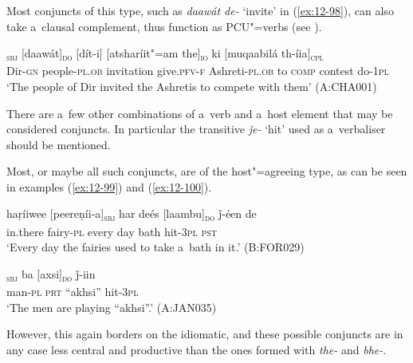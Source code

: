 Most conjuncts of this type, such as \textit{daawát de-} `invite' in (\ref{ex:12-98}), can also take a~clausal complement, thus function as PCU"=verbs (see ).

\begin{exe}
\ex
\label{ex:12-98}
\gll [deewúl-ii xálak"=am]\textsubscript{\textsc{sbj}} [daawát]\textsubscript{\textsc{do}} [dít-i] [atsharíit"=am the]\textsubscript{\textsc{io}} ki [muqaabilá th-íia]\textsubscript{\textsc{cpl}}  \\
Dir-\textsc{gn} people-\textsc{pl.ob} invitation give.\textsc{pfv-f}  Ashreti-\textsc{pl.ob} to \textsc{comp} contest do-\textsc{1pl} \\
\glt `The people of Dir invited the Ashretis to compete with them' (A:CHA001)
\end{exe}

 There are a~few other combinations of a~verb and a~host element that may be considered conjuncts. In particular the transitive \textit{ǰe-} `hit' used as a~verbaliser should be mentioned.


Most, or maybe all such conjuncts, are of the host"=agreeing type, as can be seen in examples (\ref{ex:12-99}) and (\ref{ex:12-100}). 

\begin{exe}
\ex
\label{ex:12-99}
\gll haṛíiwee [peereṇíi-a]\textsubscript{\textsc{sbj}} har deés [laambu]\textsubscript{\textsc{do}} ǰ-éen de \\
in.there fairy-\textsc{pl} every day bath hit-\textsc{3pl} \textsc{pst} \\
\glt `Every day the fairies used to take a~bath in it.' (B:FOR029)
\end{exe}
\begin{exe}
\ex
\label{ex:12-100}
\gll [miiš-a]\textsubscript{\textsc{sbj}} ba [axsi]\textsubscript{\textsc{do}} ǰ-iin  \\
man-\textsc{pl} \textsc{prt} ``akhsi'' hit-\textsc{3pl} \\
\glt `The men are playing ``akhsi''.' (A:JAN035)
\end{exe}

However, this again borders on the idiomatic, and these possible conjuncts are in any case less central and productive than the ones formed with \textit{the-} and \textit{bhe-}.